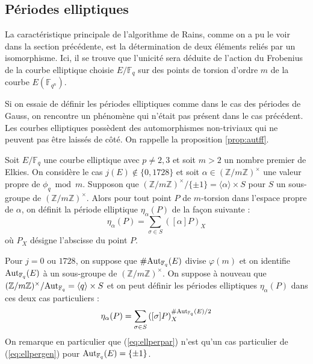 \documentclass[a4paper]{article} %
\numberwithin{section}{part}
\numberwithin{equation}{section}
\newcommand\zmodninv[1]{(\mathbb{Z}/#1\mathbb{Z})^{\times}}
\newcommand\GF[1]{\mathbb{F}_{#1}}
\newcommand\groupgen[1]{\langle{#1}\rangle}
\begin{document}
\subsection{Périodes elliptiques}
\label{sec:perell}
La caractéristique principale de l'algorithme de Rains, comme on a pu le voir
dans la section précédente, est la détermination de deux éléments reliés
par un isomorphisme. Ici, il se trouve que l'unicité sera déduite de
l'action du Frobenius de la courbe elliptique choisie $E/\GF{q}$ sur des points
de torsion d'ordre $m$ de la courbe $E(\GF{q^n})$.\par
Si on essaie de définir les périodes elliptiques comme dans le cas des périodes
de Gauss, on rencontre un phénomène qui n'était pas présent dans le cas
précédent. Les courbes elliptiques possèdent des automorphismes non-triviaux qui
ne peuvent pas être laissés de côté. On rappelle la proposition
\ref{prop:autff}.\par
\begin{defn}
Soit $E/\GF{q}$ une courbe elliptique avec $p\neq2, 3$ et soit $m > 2$
un nombre premier de Elkies. On considère le cas 
$j(E)\notin\lbrace{0, 1728}\rbrace$ et soit $\alpha\in\zmodninv{m}$ une valeur 
propre de $\phi_q\bmod{m}$. Supposon que $\zmodninv{m}/\lbrace{\pm1}\rbrace = 
\groupgen{\alpha}\times S$ pour $S$ un sous-groupe de $\zmodninv{m}$. Alors pour
tout point $P$ de $m$-torsion dans l'espace propre de $\alpha$, on définit la 
période elliptique $\eta_{\alpha}(P)$ de la façon suivante :
\begin{equation}
\label{eq:ellperpar}
\eta_{\alpha}(P) = \sum_{\sigma\in S}{([\alpha]P)_X}
\end{equation}
où $P_X$ désigne l'abscisse du point $P$.\par
Pour $j = 0$ ou $1728$, on suppose que $\#\textup{Aut}_{\GF{q}}(E)$ divise
$\varphi(m)$ et on identifie $\textup{Aut}_{\GF{q}}(E)$ à un sous-groupe de 
$\zmodninv{m}$. On suppose à nouveau que $\zmodninv{m}/\textup{Aut}_{\GF{q}} = 
\groupgen{q}\times S$ et on peut définir les périodes elliptiques
$\eta_{\alpha}(P)$ dans ces deux cas particuliers :
\begin{equation}
\label{eq:ellpergen}
\eta_{\alpha}(P) = \sum_{\sigma\in S}
{\left([\sigma]P\right)_X^{\#\textup{Aut}_{\GF{q}}(E)/2}}
\end{equation}
On remarque en particulier que (\ref{eq:ellperpar}) n'est qu'un cas particulier
de (\ref{eq:ellpergen}) pour $\textup{Aut}_{\GF{q}}(E) = \lbrace{\pm1}\rbrace$.
\end{defn}
\end{document}
